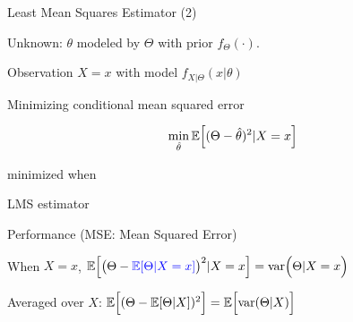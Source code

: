 \begin{frame}{Least Mean Squares Estimator (2)}

\plitemsep 0.1in
\bci

\item<1-> Unknown: $\theta$ modeled by $\Theta$ with prior $f_{\Theta}(\cdot).$

\item<1-> Observation $X=x$ with model $f_{X|\Theta}(x|\theta)$

\item<2-> Minimizing conditional mean squared error

$$
\min_{\hat{\theta}} \mathbb{E}\Bigl[ (\Theta - \hat{\theta})^2 | X=x \Bigr]
$$

\bci
\item<3-> minimized when 
\item<4->  LMS estimator 
\eci

\item<5-> Performance (MSE: Mean Squared Error)
\bci
\item<6-> When $X=x$, $\mathbb{E}\Bigl[ \big(\Theta - {\color{blue} \mathbb{E}[ \Theta | X=x ]} \big)^2 | X=x \Bigr] = \text{var}\Bigl( \Theta | X=x \Bigr)$
\item<7-> Averaged over $X$: $\mathbb{E}\Bigl[ (\Theta - \mathbb{E}[ \Theta | X ]
    )^2 \Bigr] =  \mathbb{E}\Bigl[ \text{var}( \Theta | X ) \Bigr]$
\eci



\eci

\end{frame}


